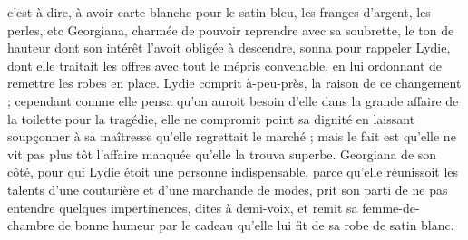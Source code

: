 c'est-à-dire, à avoir carte blanche pour le satin bleu, les franges d'argent, les perles, etc Georgiana, charmée de pouvoir reprendre avec sa soubrette, le ton de hauteur dont son intérêt l'avoit obligée à descendre, sonna pour rappeler Lydie, dont elle traitait les offres avec tout le mépris convenable, en lui ordonnant de remettre les robes en place. Lydie comprit à-peu-près, la raison de ce changement ; cependant comme elle pensa qu'on auroit besoin d'elle dans la grande affaire de la toilette pour la tragédie, elle ne compromit point sa dignité en laissant soupçonner à sa maîtresse qu'elle regrettait le marché ; mais le fait est qu'elle ne vit pas plus tôt l'affaire manquée qu'elle la trouva superbe. Georgiana de son côté, pour qui Lydie étoit une personne indispensable, parce qu'elle réunissoit les talents d'une couturière et d'une marchande de modes, prit son parti de ne pas entendre quelques impertinences, dites à demi-voix, et remit sa femme-de-chambre de bonne humeur par le cadeau qu'elle lui fit de sa robe de satin blanc.